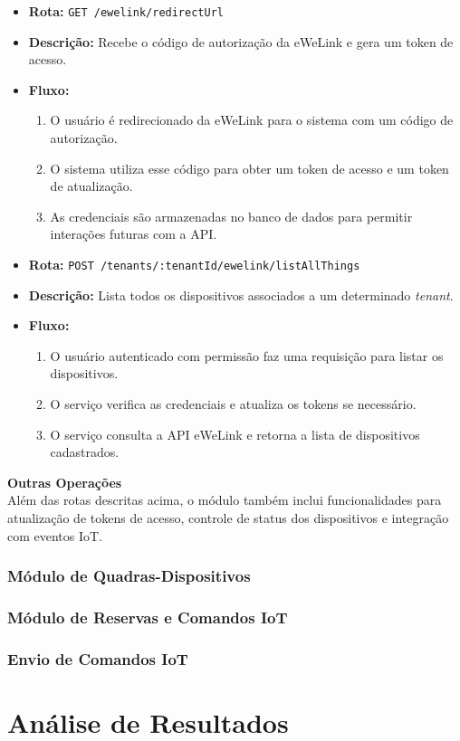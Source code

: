 \begin{itemize}
    \item \textbf{Rota:} \texttt{GET /ewelink/redirectUrl}
    \item \textbf{Descrição:} Recebe o código de autorização da eWeLink e gera um token de acesso.
    \item \textbf{Fluxo:}
    \begin{enumerate}
        \item O usuário é redirecionado da eWeLink para o sistema com um código de autorização.
        \item O sistema utiliza esse código para obter um token de acesso e um token de atualização.
        \item As credenciais são armazenadas no banco de dados para permitir interações futuras com a API.
    \end{enumerate}
\end{itemize}

\begin{itemize}
    \item \textbf{Rota:} \texttt{POST /tenants/:tenantId/ewelink/listAllThings}
    \item \textbf{Descrição:} Lista todos os dispositivos associados a um determinado \textit{tenant}.
    \item \textbf{Fluxo:}
    \begin{enumerate}
        \item O usuário autenticado com permissão faz uma requisição para listar os dispositivos.
        \item O serviço verifica as credenciais e atualiza os tokens se necessário.
        \item O serviço consulta a API eWeLink e retorna a lista de dispositivos cadastrados.
    \end{enumerate}
\end{itemize}

\textbf{Outras Operações}\\
Além das rotas descritas acima, o módulo também inclui funcionalidades para atualização de tokens de acesso, controle de status dos dispositivos e integração com eventos IoT.

\subsubsection{Módulo de Quadras-Dispositivos}\label{subsubsec:modulo_quadras_dispositivos}

\subsubsection{Módulo de Reservas e Comandos IoT}\label{subsubsec:modulo_reservas}

\subsubsection{Envio de Comandos IoT}\label{subsubsec:envio_comandos_iot}

\section{Análise de Resultados}\label{sec:analise_resultados}
